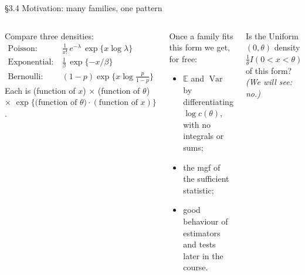 \documentclass[aspectratio=169,t,10pt]{beamer}
\newcommand{\E}{\mathbb{E}}
\newcommand{\Var}{\operatorname{Var}}
\begin{document}
\begin{frame}{\S3.4 Motivation: many families, one pattern}
  \begin{columns}[T]
  Compare three densities:
  \begin{align*}
  \text{Poisson:}&\ \tfrac1{x!}\,e^{-\lambda}\,\exp\{x\log\lambda\}\\
  \text{Exponential:}&\ \tfrac1\beta\,\exp\{-x/\beta\}\\
  \text{Bernoulli:}&\ (1-p)\exp\{x\log\tfrac p{1-p}\}
  \end{align*}
  Each is (function of $x$) $\times$ (function of $\theta$) $\times$ $\exp\{\text{(function of }\theta)\cdot(\text{function of }x)\}$.
  \begin{tcolorbox}[mydef={Payoff of recognizing the pattern}]\small
  Once a family fits this form we get, for free:
  \begin{itemize}
    \item $\E$ and $\Var$ by differentiating $\log c(\theta)$, with no integrals or sums;
    \item the mgf of the sufficient statistic;
    \item good behaviour of estimators and tests later in the course.
  \end{itemize}
  \end{tcolorbox}
  \begin{tcolorbox}[myquiz={Think (1 min)}]\small
  Is the Uniform$(0,\theta)$ density $\frac1\theta I(0<x<\theta)$ of this form? \emph{(We will see: no.)}
  \end{tcolorbox}
  \end{columns}
\end{frame}
\end{document}
